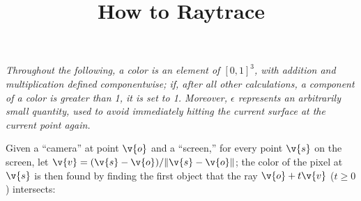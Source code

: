 \documentclass{article}
\title{How to Raytrace}
\begin{document}
\maketitle

\emph{Throughout the following, a color is an element of $[0,1]^3$, with
addition and multiplication defined componentwise; if, after all other
calculations, a component of a color is greater than 1, it is set to 1.
Moreover, $\epsilon$ represents an arbitrarily small quantity, used to avoid
immediately hitting the current surface at the current point again.}

\vspace{2ex}

Given a ``camera'' at point $\v{o}$ and a ``screen,'' for every point $\v{s}$ on the screen, let $\v{v} = (\v{s}-\v{o})/\|\v{s}-\v{o}\|$; the color of the pixel at $\v{s}$ is then found by finding the first object that the ray $\v{o}+t\v{v}$ ($t\geq 0$) intersects:
\end{document}

